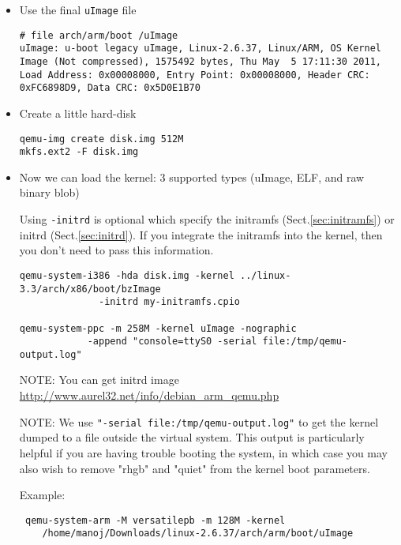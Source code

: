 \begin{itemize}  
  \item Use the final \verb!uImage! file
\begin{verbatim}
# file arch/arm/boot /uImage 
uImage: u-boot legacy uImage, Linux-2.6.37, Linux/ARM, OS Kernel Image (Not compressed), 1575492 bytes, Thu May  5 17:11:30 2011, Load Address: 0x00008000, Entry Point: 0x00008000, Header CRC: 0xFC6898D9, Data CRC: 0x5D0E1B70
\end{verbatim}

  \item Create a  little hard-disk 
\begin{verbatim}
qemu-img create disk.img 512M
mkfs.ext2 -F disk.img
\end{verbatim}

  \item Now we can load the kernel: 3 supported types (uImage, ELF, and raw
  binary blob)

Using \verb!-initrd! is optional which specify the initramfs
(Sect.\ref{sec:initramfs}) or initrd (Sect.\ref{sec:initrd}). If you integrate
the initramfs into the kernel, then you don't need to pass this information.
\begin{verbatim}
qemu-system-i386 -hda disk.img -kernel ../linux-3.3/arch/x86/boot/bzImage
              -initrd my-initramfs.cpio

qemu-system-ppc -m 258M -kernel uImage -nographic 
            -append "console=ttyS0 -serial file:/tmp/qemu-output.log"

\end{verbatim}

NOTE: You can get initrd image 
\url{http://www.aurel32.net/info/debian_arm_qemu.php}


NOTE: We use \verb!"-serial file:/tmp/qemu-output.log"! to get the kernel
dumped to a file outside the virtual system.
This output is particularly helpful if you are having trouble booting the
system, in which case you may also wish to remove "rhgb" and "quiet" from the kernel boot parameters.



 Example:
\begin{verbatim}
 qemu-system-arm -M versatilepb -m 128M -kernel
    /home/manoj/Downloads/linux-2.6.37/arch/arm/boot/uImage
\end{verbatim}


\end{itemize}
